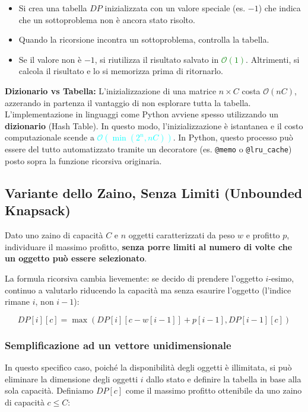 \documentclass[12pt, a4paper]{article}
\begin{document}
\begin{itemize}
\item Si crea una tabella $DP$ inizializzata con un valore speciale (es. $-1$) che indica che un sottoproblema non è ancora stato risolto.
\item Quando la ricorsione incontra un sottoproblema, controlla la tabella.
\item Se il valore non è $-1$, si riutilizza il risultato salvato in \textcolor{green}{$\mathcal{O}(1)$}. Altrimenti, si calcola il risultato e lo si memorizza prima di ritornarlo.
\end{itemize}

\textbf{Dizionario vs Tabella:}
L'inizializzazione di una matrice $n \times C$ costa $\mathcal{O}(nC)$, azzerando in partenza il vantaggio di non esplorare tutta la tabella. L'implementazione in linguaggi come Python avviene spesso utilizzando un \textbf{dizionario} (Hash Table). In questo modo, l'inizializzazione è istantanea e il costo computazionale scende a \textcolor{cyan}{$\mathcal{O}(\min(2^n, nC))$}. In Python, questo processo può essere del tutto automatizzato tramite un decoratore (es. \texttt{@memo} o \texttt{@lru_cache}) posto sopra la funzione ricorsiva originaria.

\subsection{Variante dello Zaino, Senza Limiti (Unbounded Knapsack)}
\begin{tcolorbox}[colback=lightergray!10, colframe=tocsec, title=\textbf{Definizione}]
Dato uno zaino di capacità $C$ e $n$ oggetti caratterizzati da peso $w$ e profitto $p$, individuare il massimo profitto, \textbf{senza porre limiti al numero di volte che un oggetto può essere selezionato}.
\end{tcolorbox}

La formula ricorsiva cambia lievemente: se decido di prendere l'oggetto $i$-esimo, continuo a valutarlo riducendo la capacità ma senza esaurire l'oggetto (l'indice rimane $i$, non $i-1$):


$$DP[i][c]=\max(DP[i][c-w[i-1]]+p[i-1],DP[i-1][c])$$

\subsubsection{Semplificazione ad un vettore unidimensionale}
In questo specifico caso, poiché la disponibilità degli oggetti è illimitata, si può eliminare la dimensione degli oggetti $i$ dallo stato e definire la tabella in base alla sola capacità.
Definiamo $DP[c]$ come il massimo profitto ottenibile da uno zaino di capacità $c \le C$:
\end{document}
